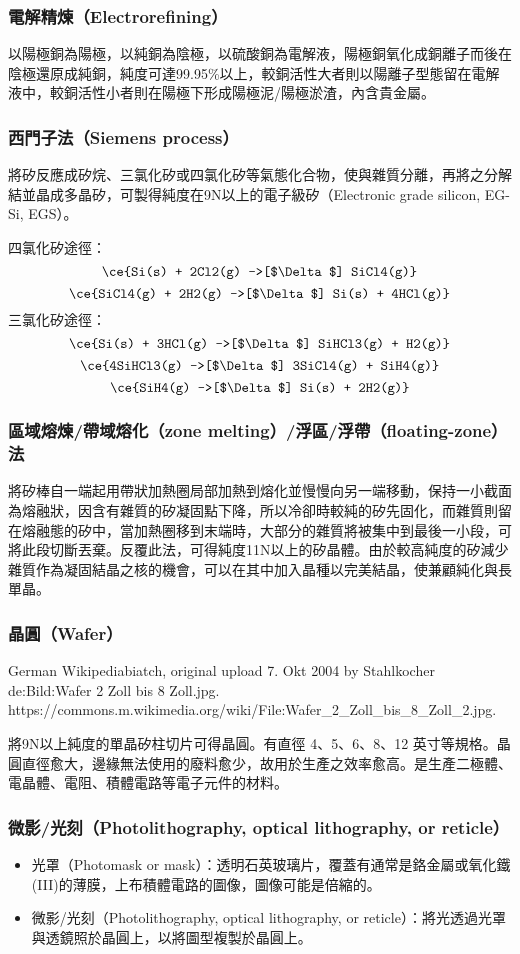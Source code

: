 \documentclass[a4paper,12pt]{report}
\begin{document}
\begin{itemize}
\subsubsection{電解精煉（Electrorefining）}
以陽極銅為陽極，以純銅為陰極，以硫酸銅為電解液，陽極銅氧化成銅離子而後在陰極還原成純銅，純度可達99.95\%以上，較銅活性大者則以陽離子型態留在電解液中，較銅活性小者則在陽極下形成陽極泥/陽極淤渣，內含貴金屬。
\subsubsection{西門子法（Siemens process）}
將矽反應成矽烷、三氯化矽或四氯化矽等氣態化合物，使與雜質分離，再將之分解結並晶成多晶矽，可製得純度在9N以上的電子級矽（Electronic grade silicon, EG-Si, EGS）。

四氯化矽途徑：
\[\ce{Si(s) + 2Cl2(g) ->[$\Delta$] SiCl4(g)}\]
\[\ce{SiCl4(g) + 2H2(g) ->[$\Delta$] Si(s) + 4HCl(g)}\]
三氯化矽途徑：
\[\ce{Si(s) + 3HCl(g) ->[$\Delta$] SiHCl3(g) + H2(g)}\]
\[\ce{4SiHCl3(g) ->[$\Delta$] 3SiCl4(g) + SiH4(g)}\]
\[\ce{SiH4(g) ->[$\Delta$] Si(s) + 2H2(g)}\]
\subsubsection{區域熔煉/帶域熔化（zone melting）/浮區/浮帶（floating-zone）法}
將矽棒自一端起用帶狀加熱圈局部加熱到熔化並慢慢向另一端移動，保持一小截面為熔融狀，因含有雜質的矽凝固點下降，所以冷卻時較純的矽先固化，而雜質則留在熔融態的矽中，當加熱圈移到末端時，大部分的雜質將被集中到最後一小段，可將此段切斷丟棄。反覆此法，可得純度11N以上的矽晶體。由於較高純度的矽減少雜質作為凝固結晶之核的機會，可以在其中加入晶種以完美結晶，使兼顧純化與長單晶。
\subsubsection{晶圓（Wafer）}
\bct\bfH\ctr{}\caption{German Wikipediabiatch, original upload 7. Okt 2004 by Stahlkocher de:Bild:Wafer 2 Zoll bis 8 Zoll.jpg. https://commons.m.wikimedia.org/wiki/File:Wafer\_2\_Zoll\_bis\_8\_Zoll\_2.jpg.}\ef\FB\ect
將9N以上純度的單晶矽柱切片可得晶圓。有直徑 4、5、6、8、12 英寸等規格。晶圓直徑愈大，邊緣無法使用的廢料愈少，故用於生產之效率愈高。是生產二極體、電晶體、電阻、積體電路等電子元件的材料。
\subsubsection{微影/光刻（Photolithography, optical lithography, or reticle）}
\begin{itemize}
\item 光罩（Photomask or mask）：透明石英玻璃片，覆蓋有通常是鉻金屬或氧化鐵(III)的薄膜，上布積體電路的圖像，圖像可能是倍縮的。
\item 微影/光刻（Photolithography, optical lithography, or reticle）：將光透過光罩與透鏡照於晶圓上，以將圖型複製於晶圓上。
\end{itemize}

\end{itemize}
\end{document}
